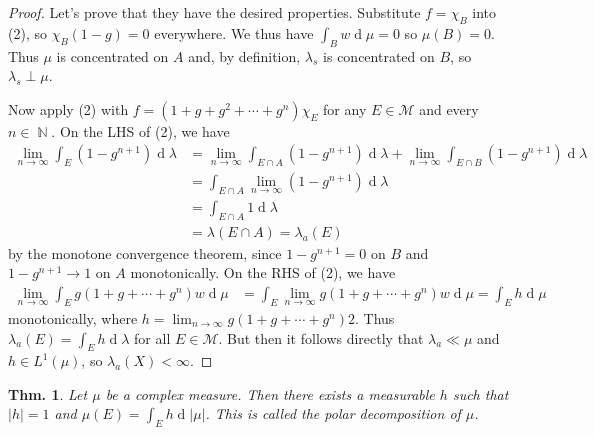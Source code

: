 \documentclass[12pt, a4paper]{book}
\DeclareMathOperator{\N}{\mathbb{N}}
\renewcommand{\d}[1]{\ensuremath{\operatorname{d}\!{#1}}} %
\newtheorem{theorem}{Thm.}[section]
\theoremstyle{nonumberplain}
\newtheorem{proof}{Proof}
\begin{document}
\begin{proof}
    Let's prove that they have the desired properties.
    Substitute $f=\chi_B$ into (2), so $\chi_B(1-g)=0$ everywhere.
    We thus have $\int_B w\d{\mu}=0$ so $\mu(B)=0$.
    Thus $\mu$ is concentrated on $A$ and, by definition, $\lambda_s$ is concentrated on $B$, so $\lambda_s\perp\mu$.

    Now apply (2) with $f=(1+g+g^2+\cdots+g^n)\chi_E$ for any $E\in\mathcal{M}$ and every $n\in\N$.
    On the LHS of (2), we have
    \begin{align*}
        \lim_{n\to\infty}\int_E(1-g^{n+1})\d{\lambda} &= \lim_{n\to\infty}\int_{E\cap A}(1-g^{n+1})\d{\lambda}+\lim_{n\to\infty}\int_{E\cap B}(1-g^{n+1})\d{\lambda}\\
                                                      &= \int_{E\cap A}\lim_{n\to\infty}(1-g^{n+1})\d{\lambda}\\
                                                      &=\int_{E\cap A}1\d{\lambda}\\
                                                      &=\lambda(E\cap A)=\lambda_a(E)
    \end{align*}
    by the monotone convergence theorem, since $1-g^{n+1}=0$ on $B$ and $1-g^{n+1}\to 1$ on $A$ monotonically.
    On the RHS of (2), we have
    \begin{align*}
        \lim_{n\to\infty} \int_Eg(1+g+\cdots+g^n)w\d{\mu} &= \int_E \lim_{n\to\infty} g(1+g+\cdots+g^n)w\d{\mu}=\int_E h\d{\mu}
    \end{align*}
    monotonically, where $h=\lim_{n\to\infty}g(1+g+\cdots+g^n)2$.
    Thus $\lambda_a(E)=\int_E h\d{\lambda}$ for all $E\in\mathcal{M}$.
    But then it follows directly that $\lambda_a\ll\mu$ and $h\in L^1(\mu)$, so $\lambda_a(X)<\infty$.
\end{proof}
\begin{theorem}
    Let $\mu$ be a complex measure.
    Then there exists a measurable $h$ such that $|h|=1$ and $\mu(E)=\int_E h\d{|\mu|}$.
    This is called the polar decomposition of $\mu$.
\end{theorem}
\end{document}
